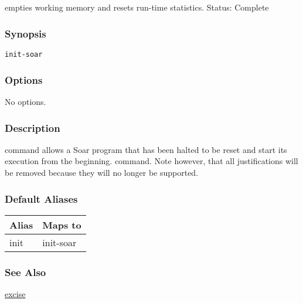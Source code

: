 \subsection{}
\label{init-soar}
empties working memory and resets run-time statistics. 
 Status: Complete
\subsubsection*{Synopsis}
\begin{verbatim}
init-soar
\end{verbatim}
\subsubsection*{Options}
 No options. 
\subsubsection*{Description}
 command allows a Soar program that has been halted to be reset and start its execution from the beginning. 
 command. Note however, that all justifications will be removed because they will no longer be supported. 
\subsubsection*{Default Aliases}
\begin{tabular}{|l|l|}
\hline 
 Alias  & Maps to  \\
 \hline 
 init  & init-soar  \\
 \hline 
\end{tabular}
\subsubsection*{See Also}
\hyperref[excise]{excise} 